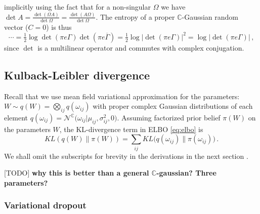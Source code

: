 \documentclass[a4paper,10pt]{article}
\newcommand{\important}[1]{\textbf{\color{red} #1}}
\newcommand{\todo}[1]{{\color{blue} [TODO]} \important{#1}}
\newcommand{\cplx}{\mathbb{C}}
\newcommand{\conj}[1]{\overline{#1}}
\begin{document}
implicitly using the fact that for a non-singular $\Omega$ we have $
  \det{A}
    = \tfrac{\det{(\Omega A)}}{\det{\Omega}}
    = \tfrac{\det{(A \Omega)}}{\det{\Omega}}
$. The entropy of a proper $\cplx$-Gaussian random vector ($C = 0$) is thus 
\begin{equation}  \label{eq:cn-proper-entropy}
\cdots
  = \tfrac12 \log \det{(\pi e \Gamma)} \det{(\pi e \conj{\Gamma})}
  = \tfrac12 \log \bigl\lvert \det{(\pi e \Gamma)} \bigr\rvert^2
  = \log \bigl\lvert \det{(\pi e \Gamma)} \bigr\rvert
  \,,
\end{equation}
since $\det$ is a multilinear operator and commutes with complex conjugation.


\subsection{Kulback-Leibler divergence} %
\label{sub:kulback_leibler_divergence}

Recall that we use mean field variational approximation for the parameters: $
  W \sim q(W)
    = \bigotimes_{ij} q(\omega_{ij})
$ with proper complex Gaussian distributions of each element $
  q(\omega_{ij})
    = \mathcal{N}^{\cplx}\bigl(
      \omega_{ij} \big\vert
      \mu_{ij}, \sigma^2_{ij}, 0
    \bigr)
$. Assuming factorized prior belief $\pi(W)$ on the parameters $W$, the KL-divergence
term in ELBO \eqref{eq:elbo} is
\begin{equation}  \label{eq:elbo-general-kl-div}
KL(q(W) \| \pi(W))
  = \sum_{ij} KL\bigl(
    q(\omega_{ij}) \| \pi(\omega_{ij})
  \bigr)
  \,.
\end{equation}
We shall omit the subscripts for brevity in the derivations in the next section .

\todo{why this is better than a general $\cplx$-gaussian? Three parameters?}

\subsubsection{Variational dropout} %
\label{ssub:variational_dropout}
\end{document}
